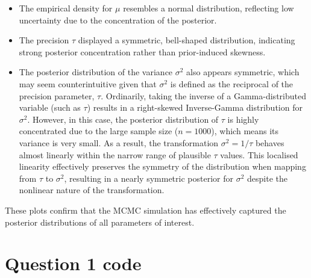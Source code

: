 \documentclass[]{article}
\begin{document}
\begin{itemize}
	\item The empirical density for $\mu$ resembles a normal distribution, reflecting low uncertainty due to the concentration of the posterior.
	\item The precision $\tau$ displayed a symmetric, bell-shaped distribution, indicating strong posterior concentration rather than prior-induced skewness.
	\item The posterior distribution of the variance $\sigma^2$ also appears symmetric, which may seem counterintuitive given that $\sigma^2$ is defined as the reciprocal of the precision parameter, $\tau$. Ordinarily, taking the inverse of a Gamma-distributed variable (such as $\tau$) results in a right-skewed Inverse-Gamma distribution for $\sigma^2$. However, in this case, the posterior distribution of $\tau$ is highly concentrated due to the large sample size ($n = 1000$), which means its variance is very small. As a result, the transformation $\sigma^2 = 1/\tau$ behaves almost linearly within the narrow range of plausible $\tau$ values. This localised linearity effectively preserves the symmetry of the distribution when mapping from $\tau$ to $\sigma^2$, resulting in a nearly symmetric posterior for $\sigma^2$ despite the nonlinear nature of the transformation.
	
\end{itemize}

These plots confirm that the MCMC simulation has effectively captured the posterior distributions of all parameters of interest.










\appendix

\section{Question 1 code} \label{appendix:a}
\end{document}

